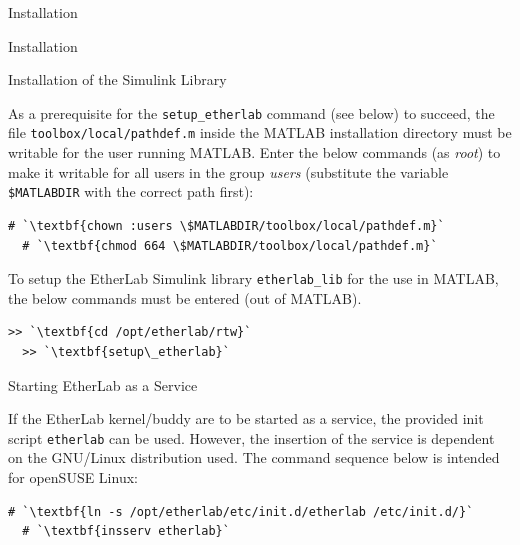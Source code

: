 \begin{ighsec}{Installation}
\begin{ighsec}{Installation}
\end{ighsec}

\begin{ighsec}{Installation of the Simulink Library}
\label{sec:inst-blockset}

As a prerequisite for the \texttt{setup\_etherlab} command (see below) to
succeed, the file \texttt{toolbox/local/pathdef.m} inside the MATLAB
installation directory must be writable for the user running MATLAB. Enter the
below commands (as \textit{root}) to make it writable for all users in the
group \textit{users} (substitute the variable \texttt{\$MATLABDIR} with the
correct path first):

\begin{lstlisting}[gobble=2]
  # `\textbf{chown :users \$MATLABDIR/toolbox/local/pathdef.m}`
  # `\textbf{chmod 664 \$MATLABDIR/toolbox/local/pathdef.m}`
\end{lstlisting}

To setup the EtherLab Simulink library \texttt{etherlab\_lib} for the use in
MATLAB, the below commands must be entered (out of MATLAB).

\begin{lstlisting}[gobble=2]
  >> `\textbf{cd /opt/etherlab/rtw}`
  >> `\textbf{setup\_etherlab}`
\end{lstlisting}

\end{ighsec}

\begin{ighsec}{Starting EtherLab as a Service}
\label{sec:dienst}

If the EtherLab kernel/buddy are to be started as a service, the provided init
script \texttt{etherlab} can be used. However, the insertion of the service is
dependent on the GNU/Linux distribution used. The command sequence below is
intended for openSUSE Linux:

\begin{lstlisting}[gobble=2]
  # `\textbf{ln -s /opt/etherlab/etc/init.d/etherlab /etc/init.d/}`
  # `\textbf{insserv etherlab}`
\end{lstlisting}

\end{ighsec}

\end{ighsec}


